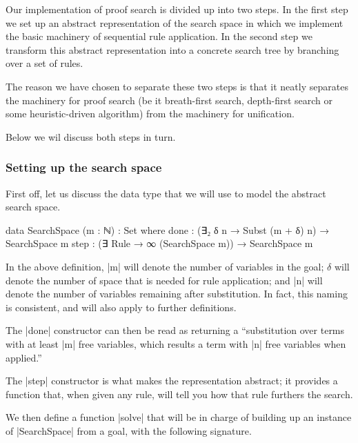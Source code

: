 \documentclass[preprint]{sigplanconf}
\begin{document}
Our implementation of proof search is divided up into two steps.
In the first step we set up an abstract representation of the search
space in which we implement the basic machinery of sequential rule
application.
In the second step we transform this abstract representation into a
concrete search tree by branching over a set of rules.

The reason we have chosen to separate these two steps is that it
neatly separates the machinery for proof search (be it breath-first
search, depth-first search or some heuristic-driven algorithm) from
the machinery for unification.

Below we wil discuss both steps in turn.

\subsubsection*{Setting up the search space}

First off, let us discuss the data type that we will use to model the
abstract search space.

\begin{code}
  data SearchSpace (m : ℕ) : Set where
    done  : (∃₂ δ n → Subst (m + δ) n) → SearchSpace m
    step  : (∃ Rule → ∞ (SearchSpace m)) → SearchSpace m
\end{code}

In the above definition, |m| will denote the number of variables in
the goal; $\delta$ will denote the number of space that is needed for
rule application; and |n| will denote the number of variables
remaining after substitution. In fact, this naming is consistent, and
will also apply to further definitions.

The |done| constructor can then be read as returning a ``substitution
over terms with at least |m| free variables, which results a term with
|n| free variables when applied.''

The |step| constructor is what makes the representation abstract; it
provides a function that, when given any rule, will tell you how that
rule furthers the search.


We then define a function |solve| that will be in charge of building
up an instance of |SearchSpace| from a goal, with the following
signature.

\end{document}

